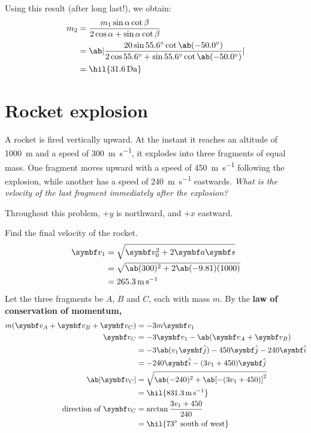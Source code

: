 Using this result (after long last!), we obtain:
\begin{align*}
  m_2 &= \dfrac{m_1\sin\alpha\cot\beta}{2\cos\alpha + \sin\alpha\cot\beta} \\
  &=
  \ab|\frac{20\sin\qty{55.6}{\degree}\cot\ab(\qty{-50.0}{\degree})}{2\cos\qty{55.6}{\degree}
  + \sin\qty{55.6}{\degree}\cot\ab(\qty{-50.0}{\degree})}| \\
  &= \hil{\qty{31.6}{\dalton}}
\end{align*}

\section{Rocket explosion}
A rocket is fired vertically upward. At the instant it reaches an
altitude of \qty{1000}{\metre} and a
speed of \qty{300}{\metre\per\second}, it explodes into three
fragments of equal mass. One fragment moves
upward with a speed of \qty{450}{\metre\per\second} following the
explosion, while another has a speed of
\qty{240}{\metre\per\second} eastwards. \it{What is the velocity of the
last fragment immediately after the explosion?}

Throughout this problem, \(+y\) is northward, and \(+x\) eastward.

Find the final velocity of the rocket.
\begin{align*}
  \mv{v}_1 &= \sqrt{\mv{v}_0^2 + 2\mv{a}\mv{s}}\\
  &= \sqrt{\ab(300)^2 + 2\ab(-9.81)(1000)} \\
  &= \qty{265.3}{\metre\per\second}
\end{align*}
Let the three fragments be \(A\), \(B\) and \(C\), each with mass
\(m\). By the \bf{law of conservation of momentum},
\begin{align*}
  m(\mv{v}_A + \mv{v}_B + \mv{v}_C) &= -3m\mv{v}_1 \\
  \mv{v}_C &= -3\mv{v}_1 - \ab(\mv{v}_A + \mv{v}_B) \\
  &= -3\ab(v_1\jj) - 450\jj - 240\ii \\
  &= -240\ii - (3v_1 + 450)\jj \\
  \ab|\mv{v}_C| &= \sqrt{\ab(-240)^2 + \ab[-(3v_1+450)]^2}\\
  &= \hil{\qty{831.3}{\metre\per\second}} \\
  \text{direction of } \mv{v}_C &= \arctan\f{3v_1 +450}{240} \\
  &= \hil{\qty{73}{\degree}\text{ south of west}}
\end{align*}

